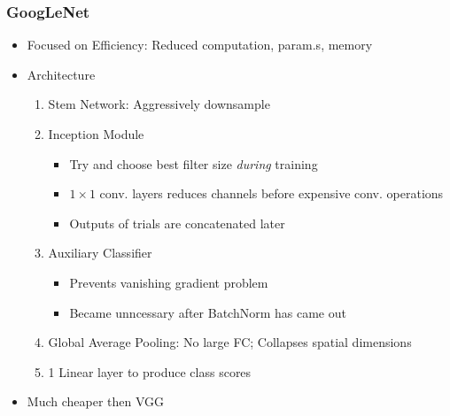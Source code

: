 \subsubsection*{GoogLeNet}
\begin{itemize}
    \item Focused on Efficiency: Reduced computation, param.s, memory
    \item Architecture
    \begin{enumerate}
        \item Stem Network: Aggressively downsample
        \item Inception Module
        \begin{itemize}
            \item Try and choose best filter size \textit{during} training
            \item $1\times1$ conv. layers reduces channels before expensive conv. operations
            \item Outputs of trials are concatenated later
        \end{itemize}
        \item Auxiliary Classifier
        \begin{itemize}
            \item Prevents vanishing gradient problem
            \item Became unncessary after BatchNorm has came out
        \end{itemize}
        \item Global Average Pooling: No large FC; Collapses spatial dimensions
        \item 1 Linear layer to produce class scores
    \end{enumerate}
    \item Much cheaper then VGG
\end{itemize}
\begin{figures}
\end{figures}

